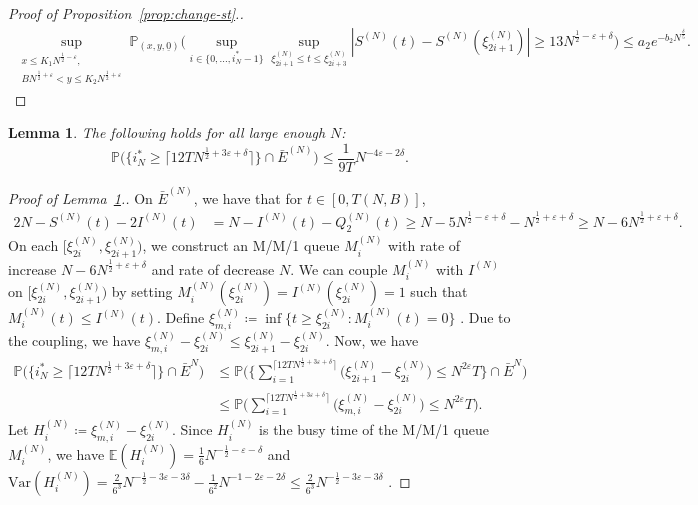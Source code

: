 \documentclass[11pt, reqno]{article}
\newtheorem{lemma}[theorem]{Lemma}
\numberwithin{equation}{section}
\numberwithin{theorem}{section}
\begin{document}
\begin{appendix}
\begin{proof}[Proof of Proposition~\ref{prop:change-st}.]
\begin{align*}
\sup_{\substack{x\leq K_1N^{\frac{1}{2} - \varepsilon},\\ BN^{\frac{1}{2} + \varepsilon} <y\leq K_2N^{\frac{1}{2} + \varepsilon}}}\mathbb{P}_{(x,y, \underline{0})}\Big(\sup_{i\in \{0,...,i^*_N-1\}}\sup_{\xi^{(N)}_{2i+1}\leq t\leq \xi^{(N)}_{2i+3}}\left|S^{(N)}(t)-S^{(N)}(\xi^{(N)}_{2i+1})\right|\geq 13 N^{\frac{1}{2}-\varepsilon+\delta} \Big)\leq a_2e^{-b_2N^{\frac{\delta}{5}}}.
\end{align*}
\end{proof}


\begin{lemma}\label{lem:bbd-i*}
The following holds for all large enough $N$:
$$\mathbb{P}\Big(\big\{i^*_N\geq \lceil 12TN^{\frac{1}{2}+3\varepsilon+\delta}\rceil\big\}\cap \bar{E}^{(N)}\Big)\leq \frac{1}{9T}N^{-4\varepsilon-2\delta}.$$
\end{lemma}
\begin{proof}[Proof of Lemma~\ref{lem:bbd-i*}.]
On $\bar{E}^{(N)}$, we have that for $t\in[0,T(N,B)]$,
\begin{align*}
    2N-S^{(N)}(t)-2 I^{(N)}(t)&=N-I^{(N)}(t)-Q^{(N)}_2(t)
    \geq N- 5N^{\frac{1}{2}-\varepsilon+\delta}-  N^{\frac{1}{2}+\varepsilon+\delta}
    \geq N-6 N^{\frac{1}{2}+\varepsilon+\delta}.
\end{align*}
On each $[\xi^{(N)}_{2i},\xi^{(N)}_{2i+1})$, we construct an M/M/1 queue $M^{(N)}_i$ with rate of increase $N-6N^{\frac{1}{2}+\varepsilon+\delta}$ and rate of decrease $N$. We can couple $M^{(N)}_i$ with $I^{(N)}$ on $[\xi^{(N)}_{2i},\xi^{(N)}_{2i+1})$ by setting $M^{(N)}_i(\xi^{(N)}_{2i})=I^{(N)}(\xi^{(N)}_{2i})=1$ such that $M^{(N)}_i(t)\leq I^{(N)}(t)$. Define $\xi^{(N)}_{m,i}\coloneqq\inf\{t\geq \xi^{(N)}_{2i}:M^{(N)}_i(t)=0\}$ . Due to the coupling, we have $\xi^{(N)}_{m,i}-\xi^{(N)}_{2i}\leq \xi^{(N)}_{2i+1}-\xi^{(N)}_{2i}$. Now, we have
\begin{align*}
    \mathbb{P}\Big(\big\{i^*_N\geq \lceil 12TN^{\frac{1}{2}+3\varepsilon+\delta}\rceil\big\}\cap \bar{E}^{N}\Big)
    &\leq \mathbb{P}\Big(\Big\{\sum_{i=1}^{\lceil 12TN^{\frac{1}{2}+3\varepsilon+\delta}\rceil}\big(\xi^{(N)}_{2i+1}-\xi^{(N)}_{2i}\big)\leq N^{2\varepsilon}T\Big\}\cap \bar{E}^{N}\Big)\\
    &\leq \mathbb{P}\Big(\sum_{i=1}^{\lceil 12TN^{\frac{1}{2}+3\varepsilon+\delta}\rceil}\big(\xi^{(N)}_{m,i}-\xi^{(N)}_{2i}\big)\leq N^{2\varepsilon}T\Big).
\end{align*}
Let $H^{(N)}_i\coloneqq\xi^{(N)}_{m,i}-\xi^{(N)}_{2i}$. Since $H^{(N)}_i$ is the busy time of the M/M/1 queue $M^{(N)}_i$, we have $\mathbb{E}(H^{(N)}_i)=\frac{1}{6}N^{-\frac{1}{2}-\varepsilon-\delta}$ and  $\mathrm{Var}(H^{(N)}_i)=\frac{2}{6^3}N^{-\frac{1}{2}-3\varepsilon-3\delta}- \frac{1}{6^2}N^{-1-2\varepsilon-2\delta}\leq \frac{2}{6^3}N^{-\frac{1}{2}-3\varepsilon-3\delta}$ \cite[Section 7.9, Page 75]{adan2017queueing}. 

\end{proof}
\end{appendix}
\end{document}
